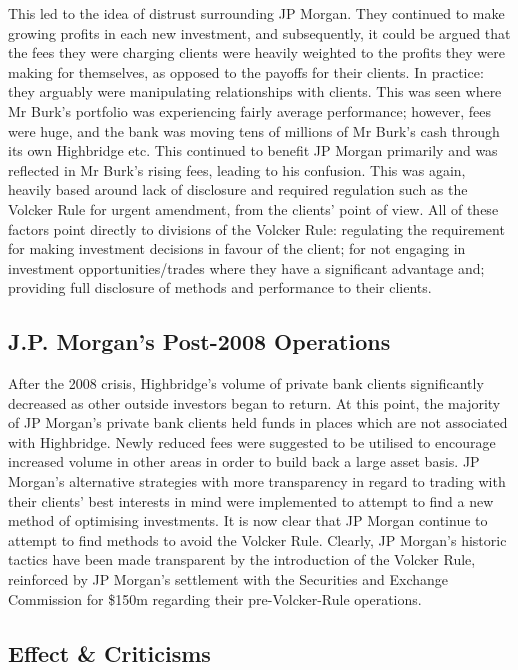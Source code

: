 \documentclass[11pt, english]{article}
\begin{document}
	This led to the idea of distrust surrounding JP Morgan. They continued to make growing profits in each new investment, and subsequently, it could be argued that the fees they were charging clients were heavily weighted to the profits they were making for themselves, as opposed to the payoffs for their clients. In practice: they arguably were manipulating relationships with clients. This was seen where Mr Burk's portfolio was experiencing fairly average performance; however, fees were huge, and the bank was moving tens of millions of Mr Burk's cash through its own Highbridge etc. This continued to benefit JP Morgan primarily and was reflected in Mr Burk's rising fees, leading to his confusion. This was again, heavily based around lack of disclosure and required regulation such as the Volcker Rule for urgent amendment, from the clients' point of view. All of these factors point directly to divisions of the Volcker Rule: regulating the requirement for making investment decisions in favour of the client; for not engaging in investment opportunities/trades where they have a significant advantage and; providing full disclosure of methods and performance to their clients.

	\subsection{J.P. Morgan's Post-2008 Operations}

	After the 2008 crisis, Highbridge's volume of private bank clients significantly decreased as other outside investors began to return. At this point, the majority of JP Morgan's private bank clients held funds in places which are not associated with Highbridge. Newly reduced fees were suggested to be utilised to encourage increased volume in other areas in order to build back a large asset basis. JP Morgan's alternative strategies with more transparency in regard to trading with their clients' best interests in mind were implemented to attempt to find a new method of optimising investments. It is now clear that JP Morgan continue to attempt to find methods to avoid the Volcker Rule. Clearly, JP Morgan's historic tactics have been made transparent by the introduction of the Volcker Rule, reinforced by JP Morgan's settlement with the Securities and Exchange Commission for \$150m regarding their pre-Volcker-Rule operations.

	\subsection{Effect \& Criticisms}
\end{document}
